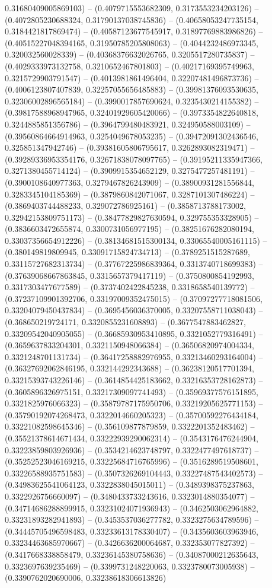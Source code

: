 0.31680409005869103) -- (0.4079715553682309, 0.3173553234203126) -- (0.4072805230688324, 0.31790137038745836) -- (0.40658053247735154, 0.3184421817869474) -- (0.40587123677545917, 0.31897769883986826) -- (0.40515227048394165, 0.31950785205808063) -- (0.4044232486973345, 0.320032560028339) -- (0.40368376632026765, 0.3205517280735837) -- (0.4029333973132758, 0.3210652467801803) -- (0.40217169395749963, 0.3215729903791547) -- (0.4013981861496404, 0.32207481496873736) -- (0.4006123807407839, 0.32257055656485883) -- (0.39981376093530635, 0.32306002896565184) -- (0.3990017857690624, 0.3235430214155382) -- (0.39817588968947965, 0.32401929605420066) -- (0.3973354822640818, 0.3244885851356786) -- (0.3964799480483921, 0.324950588003109) -- (0.39560864664914963, 0.3254049678053235) -- (0.39472091302436546, 0.325851347942746) -- (0.39381605806795617, 0.3262893082319471) -- (0.39289336953354176, 0.32671838078097765) -- (0.39195211335947366, 0.3271380455714124) -- (0.3909915354652129, 0.3275477257481191) -- (0.3900108640977363, 0.3279467826243909) -- (0.38900931281556844, 0.3283345104185369) -- (0.3879860842071067, 0.3287101307486224) -- (0.3869403744488233, 0.329072786925161) -- (0.3858713788173002, 0.32942153809751173) -- (0.38477829827630594, 0.329755353328905) -- (0.3836603472655874, 0.3300731056977195) -- (0.38251676282080194, 0.33037356654912226) -- (0.38134681515300134, 0.33065540005161115) -- (0.380149819809945, 0.33091715824734713) -- (0.3789251515287689, 0.33115727682313734) -- (0.37767225986839364, 0.3313740718699383) -- (0.37639068667863845, 0.3315657379417119) -- (0.3750800854192993, 0.3317303477677589) -- (0.3737402422845238, 0.3318658540139772) -- (0.37237109901392706, 0.33197009352475015) -- (0.37097277718081506, 0.33204079450437834) -- (0.3695456036370005, 0.33207558711038043) -- (0.368650219724171, 0.3320855231608893) -- (0.3677547883462827, 0.33209542040905055) -- (0.36685930953410895, 0.3321052779316491) -- (0.3659637833204301, 0.3321150948066384) -- (0.36506820974004334, 0.3321248701131734) -- (0.36417258882976955, 0.33213460293164004) -- (0.36327692062846195, 0.332144292343688) -- (0.36238120517701394, 0.33215393743226146) -- (0.3614854425183662, 0.33216353728162873) -- (0.3605896326975151, 0.33217309097741493) -- (0.35969377576151895, 0.3321825976066323) -- (0.35879787175950706, 0.33219205625771153) -- (0.35790192074268473, 0.3322014660205323) -- (0.35700592276434184, 0.33221082598645346) -- (0.356109877879859, 0.3322201352483462) -- (0.35521378614671434, 0.33222939290062314) -- (0.3543176476244904, 0.33223859803926936) -- (0.3534214623748797, 0.3322477497618737) -- (0.35252523046169215, 0.33225684716765996) -- (0.3516289519508601, 0.33226588935751583) -- (0.3507326269104443, 0.33227487543402573) -- (0.34983625541064123, 0.3322838045015011) -- (0.3489398375237863, 0.3322926756660097) -- (0.3480433733243616, 0.3323014880354077) -- (0.34714686288899915, 0.33231024071936943) -- (0.3462503062964882, 0.33231893282941893) -- (0.3453537036277782, 0.3323275634789596) -- (0.34445705496598483, 0.33233613178330407) -- (0.3435603603963946, 0.33234463685970667) -- (0.3426636200064687, 0.332353077827392) -- (0.3417668338858479, 0.33236145380758636) -- (0.34087000212635643, 0.3323697639235469) -- (0.3399731248220063, 0.3323780073005938) -- (0.3390762020690006, 0.33238618306613826) 